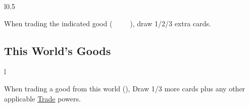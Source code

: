 \documentclass[letterpaper,landscape,twocolumn,8pt]{extarticle}
\newcommand{\inline}[1]{\scalerel*{#1}{M}}
\begin{document}
\begin{minipage}[t]{\calc{1/3}\columnwidth}

\setlength{\intextsep}{0pt}%

\begin{wrapfigure}{l}{0.5\columnwidth}
    
    
    \smallbreak{}
    
    
    \smallbreak{}
    
    
\end{wrapfigure}
When trading the indicated good (\inline{}~
\inline{}~
\inline{}~
\inline{}), draw 1/2/3 extra cards.
\end{minipage}
\begin{minipage}[t]{\calc{1/3}\columnwidth}
\subsection*{This World's Goods}

\setlength{\intextsep}{0pt}%

\begin{wrapfigure}{l}{\columnwidth}
    
    
\end{wrapfigure}

When trading a good from this world
(\inline{}), Draw 1/3 more
cards plus any other applicable \underline{Trade} powers.
\end{minipage}
\end{document}
